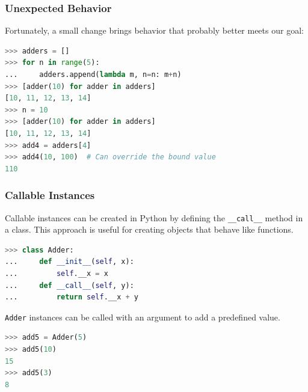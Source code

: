 \documentclass[envcountsect,10pt]{beamer}
\begin{document}
\begin{frame}[fragile]
    \frametitle{Unexpected Behavior}

    Fortunately, a small change brings behavior that probably better meets our goal:

    \begin{lstlisting}[language=Python]
>>> adders = []
>>> for n in range(5):
...     adders.append(lambda m, n=n: m+n)
>>> [adder(10) for adder in adders]
[10, 11, 12, 13, 14]
>>> n = 10
>>> [adder(10) for adder in adders]
[10, 11, 12, 13, 14]
>>> add4 = adders[4]
>>> add4(10, 100)  # Can override the bound value
110
    \end{lstlisting}

\end{frame}

\begin{frame}[fragile]
    \frametitle{Callable Instances}

    Callable instances can be created in Python by defining the \texttt{\_\_call\_\_} method in a class. 
    This approach is useful for creating objects that behave like functions.

    \begin{lstlisting}[language=Python]
>>> class Adder:
...     def __init__(self, x):
...         self.__x = x
...     def __call__(self, y):
...         return self.__x + y
    \end{lstlisting}

    \texttt{Adder} instances can be called with an argument to add a predefined value.

    \begin{lstlisting}[language=Python]
>>> add5 = Adder(5)
>>> add5(10)
15
>>> add5(3)
8
    \end{lstlisting}

\end{frame}
\end{document}
